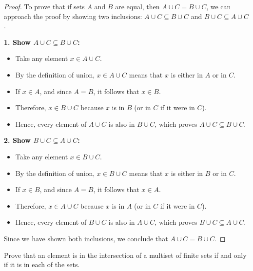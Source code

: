 \begin{proof}
  \leanok
  To prove that if sets \( A \) and \( B \) are equal, then \( A \cup C = B \cup C \), we can approach the proof by showing two inclusions: \( A \cup C \subseteq B \cup C \) and \( B \cup C \subseteq A \cup C \).

  \textbf{1. Show \( A \cup C \subseteq B \cup C \):}

  \begin{itemize}
    \item Take any element \( x \in A \cup C \).
    \item By the definition of union, \( x \in A \cup C \) means that \( x \) is either in \( A \) or in \( C \).
    \item If \( x \in A \), and since \( A = B \), it follows that \( x \in B \).
    \item Therefore, \( x \in B \cup C \) because \( x \) is in \( B \) (or in \( C \) if it were in \( C \)).
    \item Hence, every element of \( A \cup C \) is also in \( B \cup C \), which proves \( A \cup C \subseteq B \cup C \).
  \end{itemize}

  \textbf{2. Show \( B \cup C \subseteq A \cup C \):}

  \begin{itemize}
    \item Take any element \( x \in B \cup C \).
    \item By the definition of union, \( x \in B \cup C \) means that \( x \) is either in \( B \) or in \( C \).
    \item If \( x \in B \), and since \( A = B \), it follows that \( x \in A \).
    \item Therefore, \( x \in A \cup C \) because \( x \) is in \( A \) (or in \( C \) if it were in \( C \)).
    \item Hence, every element of \( B \cup C \) is also in \( A \cup C \), which proves \( B \cup C \subseteq A \cup C \).
  \end{itemize}

  Since we have shown both inclusions, we conclude that \( A \cup C = B \cup C \).
\end{proof}

\begin{lemma}\label{Multiset.eq_FinInter}
  \leanok
  Prove that an element is in the intersection of a multiset of finite sets if and only if it is in each of the sets.
\end{lemma}


